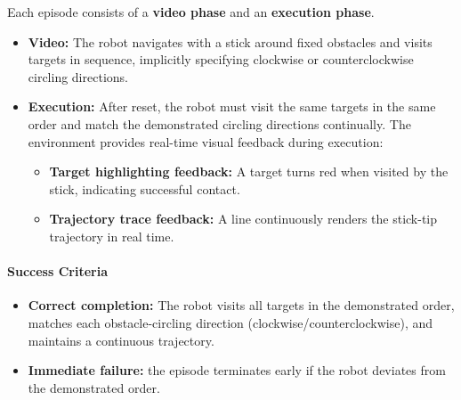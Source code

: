 Each episode consists of a \textbf{video phase} and an \textbf{execution phase}.

\begin{itemize}[itemsep=1pt, topsep=0pt, leftmargin=*]

    \item \textbf{Video:} The robot navigates with a stick around fixed obstacles and visits targets in sequence, implicitly specifying clockwise or counterclockwise circling directions.

    \item \textbf{Execution:} After reset, the robot must visit the same targets in the same order and match the demonstrated circling directions continually. The environment provides real-time visual feedback during execution:
    \begin{itemize}[itemsep=1pt, topsep=0pt, leftmargin=*]
        \item \textbf{Target highlighting feedback:} A target turns red when visited by the stick, indicating successful contact.
        \item \textbf{Trajectory trace feedback:} A line continuously renders the stick-tip trajectory in real time.
    \end{itemize}

\end{itemize}


\paragraph{Success Criteria}

\begin{itemize}[itemsep=1pt, topsep=0pt, leftmargin=*]

    \item \textbf{Correct completion:} The robot visits all targets in the demonstrated order, matches each obstacle-circling direction (clockwise/counterclockwise), and maintains a continuous trajectory.

    \item \textbf{Immediate failure:} the episode terminates early if the robot deviates from the demonstrated order.
\end{itemize}
